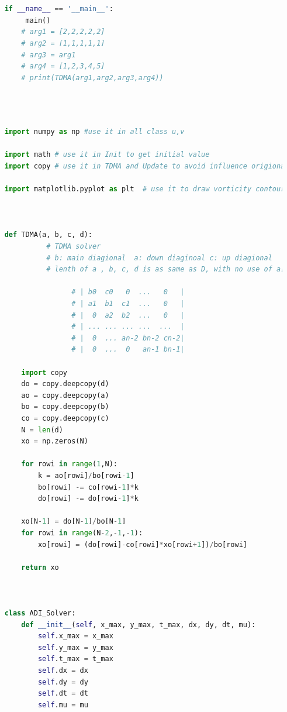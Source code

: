 \documentclass[12pt]{article}
\begin{document}
\begin{scriptsize}
\begin{lstlisting}[language=python,caption={ADI Solver}]
    
    
    if __name__ == '__main__':
         main()
        # arg1 = [2,2,2,2,2]
        # arg2 = [1,1,1,1,1]
        # arg3 = arg1
        # arg4 = [1,2,3,4,5]
        # print(TDMA(arg1,arg2,arg3,arg4))
    

\end{lstlisting}




\begin{lstlisting}[language=python,caption={Extended Region using ADI Solver}]


    import numpy as np #use it in all class u,v

    import math # use it in Init to get initial value
    import copy # use it in TDMA and Update to avoid influence origional data
    
    import matplotlib.pyplot as plt  # use it to draw vorticity contour
    
    
    
    def TDMA(a, b, c, d):  
              # TDMA solver 
              # b: main diagional  a: down diaginoal c: up diagional 
              # lenth of a , b, c, d is as same as D, with no use of a[0], a[max], c[0], c[max]
               
                    # | b0  c0   0  ...   0   |
                    # | a1  b1  c1  ...   0   |
                    # |  0  a2  b2  ...   0   |
                    # | ... ... ... ...  ...  |
                    # |  0  ... an-2 bn-2 cn-2|
                    # |  0  ...  0   an-1 bn-1|
    
        import copy
        do = copy.deepcopy(d)
        ao = copy.deepcopy(a)
        bo = copy.deepcopy(b)
        co = copy.deepcopy(c)
        N = len(d)
        xo = np.zeros(N)
        
        for rowi in range(1,N):
            k = ao[rowi]/bo[rowi-1]
            bo[rowi] -= co[rowi-1]*k
            do[rowi] -= do[rowi-1]*k
        
        xo[N-1] = do[N-1]/bo[N-1]
        for rowi in range(N-2,-1,-1):
            xo[rowi] = (do[rowi]-co[rowi]*xo[rowi+1])/bo[rowi]
    
        return xo
    
    
    
    class ADI_Solver:
        def __init__(self, x_max, y_max, t_max, dx, dy, dt, mu):
            self.x_max = x_max
            self.y_max = y_max
            self.t_max = t_max
            self.dx = dx
            self.dy = dy
            self.dt = dt
            self.mu = mu
    

\end{lstlisting}
\end{scriptsize}
\end{document}
